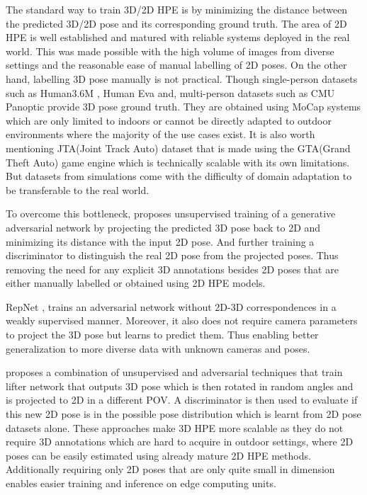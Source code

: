 The standard way to train 3D/2D \ac{HPE} is by minimizing the distance between the predicted 3D/2D pose and its corresponding ground truth. The area of 2D \ac{HPE} is well established and matured with reliable systems deployed in the real world. This was made possible with the high volume of images from diverse settings and the reasonable ease of manual labelling of 2D poses. On the other hand, labelling 3D pose manually is not practical. Though single-person datasets such as Human3.6M \cite{H3.6}, Human Eva \cite{HumanEva} and, multi-person datasets such as CMU Panoptic \cite{cmuPanoptic} provide 3D pose ground truth. They are obtained using \ac{MoCap} systems which are only limited to indoors or cannot be directly adapted to outdoor environments where the majority of the use cases exist. It is also worth mentioning JTA(Joint Track Auto) dataset \cite{JTA} that is made using the GTA(Grand Theft Auto) game engine which is technically scalable with its own limitations. But datasets from simulations come with the difficulty of domain adaptation to be transferable to the real world.  

To overcome this bottleneck, \cite{unsupervisedAdversarial} proposes unsupervised training of a generative adversarial network by projecting the predicted 3D pose back to 2D and minimizing its distance with the input 2D pose. And further training a discriminator to distinguish the real 2D pose from the projected poses. Thus removing the need for any explicit 3D annotations besides 2D poses that are either manually labelled or obtained using 2D \ac{HPE} models. 

RepNet \cite{repnet}, trains an adversarial network without 2D-3D correspondences in a weakly supervised manner. Moreover, it also does not require camera parameters to project the 3D pose but learns to predict them. Thus enabling better generalization to more diverse data with unknown cameras and poses. 

\cite{amazon1} proposes a combination of unsupervised and adversarial techniques that train lifter network that outputs 3D pose which is then rotated in random angles and is projected to 2D in a different \ac{POV}. A discriminator is then used to evaluate if this new 2D pose is in the possible pose distribution which is learnt from 2D pose datasets alone. These approaches make 3D \ac{HPE} more scalable as they do not require 3D annotations which are hard to acquire in outdoor settings, where 2D poses can be easily estimated using already mature 2D \ac{HPE} methods. Additionally requiring only 2D poses that are only quite small in dimension enables easier training and inference on edge computing units.

